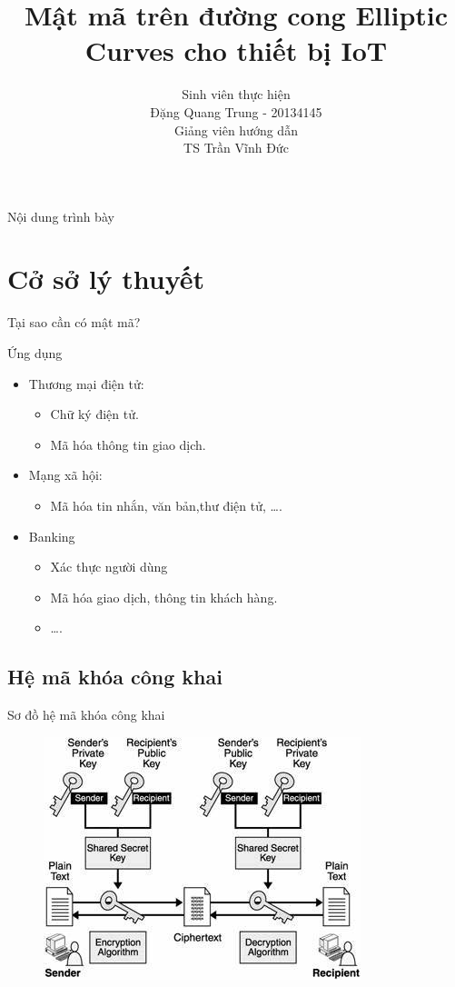 \documentclass[compress]{beamer}
\title[Mật mã trên đường cong Elliptic Curves cho thiết bị IoT]{Mật mã trên đường cong Elliptic Curves cho thiết bị IoT}
\author[Đặng Quang Trung]{
Sinh viên thực hiện\\
Đặng Quang Trung - 20134145 \\[1em]
Giảng viên hướng dẫn\\
TS Trần Vĩnh Đức}
\begin{document}
\begin{frame}[plain]
\titlepage
\end{frame}

\begin{frame}[plain]{Nội dung trình bày}
\tableofcontents
\end{frame}

\section{Cở sở lý thuyết}
\begin{frame}{Tại sao cần có mật mã?}
\end{frame}
\begin{frame}{Ứng dụng}
\begin{itemize}
\item Thương mại điện tử:
\begin{itemize}
\item Chữ ký điện tử.
\item Mã hóa thông tin giao dịch.
\end{itemize}
\item Mạng xã hội:
\begin{itemize}
\item Mã hóa tin nhắn, văn bản,thư điện tử, \ldots .
\end{itemize}
\item Banking
\begin{itemize}
\item Xác thực người dùng
\item Mã hóa giao dịch, thông tin khách hàng.
\item \ldots.
\end{itemize}
\end{itemize}
\end{frame}
\subsection{Hệ mã khóa công khai}
\begin{frame}{Sơ đồ hệ mã khóa công khai}
\begin{center}
\begin{figure}[H]
\centering
\includegraphics[width=0.65\linewidth]{../3.jpg}
\end{figure}
\end{center}
\end{frame}
\end{document}
